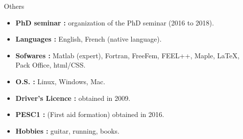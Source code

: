 \documentclass[10pt,a4paper]{report}
\begin{document}
\vspace{0.5cm}
\noindent
{\selectfont
\begin{Large}
Others
\end{Large}
\hrulefill
}
\vspace{.5cm}

\noindent
\begin{itemize}
\item \textbf{PhD seminar :} organization of the PhD seminar (2016 to 2018).
\item \textbf{Languages :} English, French (native language).
\item \textbf{Sofwares :} Matlab (expert), Fortran, FreeFem, FEEL++, Maple, \LaTeX, Pack Office, html/CSS.
\item \textbf{O.S. :} Linux, Windows, Mac.
\item \textbf{Driver's Licence :} obtained in 2009.
\item \textbf{PESC1 :} (First aid formation) obtained in 2016.
\item \textbf{Hobbies :} guitar, running, books.

\end{itemize}
\end{document}
